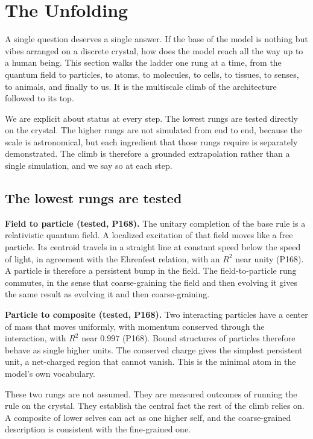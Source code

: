 \section{The Unfolding}

A single question deserves a single answer. If the base of the model is nothing but vibes arranged on a discrete crystal, how does the model reach all the way up to a human being. This section walks the ladder one rung at a time, from the quantum field to particles, to atoms, to molecules, to cells, to tissues, to senses, to animals, and finally to us. It is the multiscale climb of the architecture followed to its top.

We are explicit about status at every step. The lowest rungs are tested directly on the crystal. The higher rungs are not simulated from end to end, because the scale is astronomical, but each ingredient that those rungs require is separately demonstrated. The climb is therefore a grounded extrapolation rather than a single simulation, and we say so at each step.

\subsection{The lowest rungs are tested}

\textbf{Field to particle (tested, P168).} The unitary completion of the base rule is a relativistic quantum field. A localized excitation of that field moves like a free particle. Its centroid travels in a straight line at constant speed below the speed of light, in agreement with the Ehrenfest relation, with an $R^2$ near unity (P168). A particle is therefore a persistent bump in the field. The field-to-particle rung commutes, in the sense that coarse-graining the field and then evolving it gives the same result as evolving it and then coarse-graining.

\textbf{Particle to composite (tested, P168).} Two interacting particles have a center of mass that moves uniformly, with momentum conserved through the interaction, with $R^2$ near $0.997$ (P168). Bound structures of particles therefore behave as single higher units. The conserved charge gives the simplest persistent unit, a net-charged region that cannot vanish. This is the minimal atom in the model's own vocabulary.

These two rungs are not assumed. They are measured outcomes of running the rule on the crystal. They establish the central fact the rest of the climb relies on. A composite of lower selves can act as one higher self, and the coarse-grained description is consistent with the fine-grained one.

